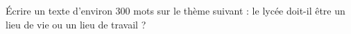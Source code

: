 
\begin{exercice}\label{exosmath-0424}

    Écrire un texte d'environ 300 mots sur le thème suivant : le lycée doit-il être un lieu de vie ou un lieu de travail ?

\end{exercice}
